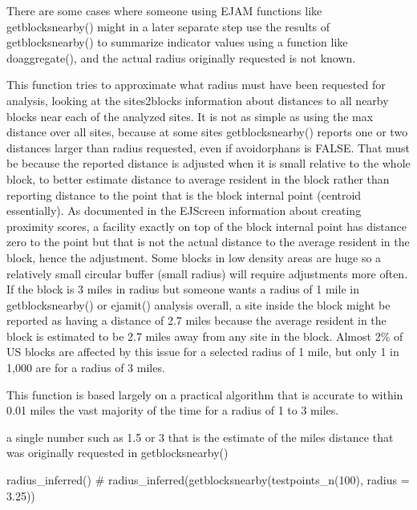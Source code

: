 \documentclass[a4paper]{book}
\begin{document}
%
\begin{Details}\relax
There are some cases where someone using EJAM functions like getblocksnearby()
might in a later separate step use the results of getblocksnearby() to summarize
indicator values using a function like doaggregate(), and the actual radius originally
requested is not known.

This function tries to approximate what radius must have been requested for analysis,
looking at the sites2blocks information about distances to all nearby blocks
near each of the analyzed sites. It is not as simple as using the max distance over all sites,
because at some sites getblocksnearby() reports one or two distances larger than
radius requested, even if avoidorphans is FALSE. That must be because the
reported distance is adjusted when it is small relative to the whole block, to
better estimate distance to average resident in the block rather than reporting
distance to the point that is the block internal point (centroid essentially).
As documented in the EJScreen information about creating proximity scores,
a facility exactly on top of the block internal point has distance zero to the point but
that is not the actual distance to the average resident in the block, hence the adjustment.
Some blocks in low density areas are huge so a relatively small circular buffer (small radius)
will require adjustments more often. If the block is 3 miles in radius but someone wants a
radius of 1 mile in getblocksnearby() or ejamit() analysis overall, a site inside the block
might be reported as having a distance of 2.7 miles because the average resident in the block
is estimated to be 2.7 miles away from any site in the block. Almost 2\% of US blocks are
affected by this issue for a selected radius of 1 mile, but only 1 in 1,000 are for a radius of 3 miles.

This function is based largely on a practical algorithm that is accurate to within 0.01 miles
the vast majority of the time for a radius of 1 to 3 miles.
\end{Details}
%
\begin{Value}
a single number such as 1.5 or 3 that is the estimate of the miles distance that was
originally requested in getblocksnearby()
\end{Value}
%
\begin{Examples}
\begin{ExampleCode}
 radius_inferred()
  # radius_inferred(getblocksnearby(testpoints_n(100), radius = 3.25))
\end{ExampleCode}
\end{Examples}
\end{document}
